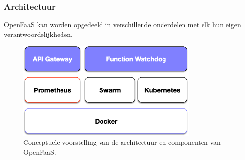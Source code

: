 \subsubsection{Architectuur}
OpenFaaS kan worden opgedeeld in verschillende onderdelen met elk hun eigen verantwoordelijkheden.
\begin{figure}
    \centering
    \includegraphics[width=0.8\textwidth]{img/openfaas-architectuur.png}
    \caption{Conceptuele voorstelling van de architectuur en componenten van OpenFaaS.}
    \label{fig:open-faas-conceptueel}  
\end{figure}

